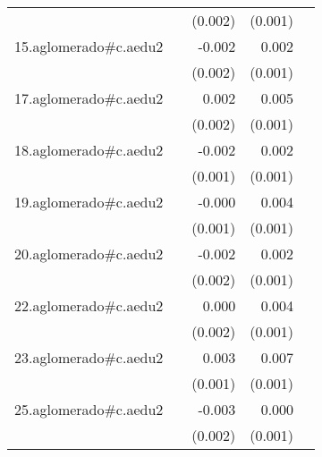 {\begin{longtable}{l*{4}{D{.}{.}{-1}}}
            &                     &     (0.002)         &     (0.001)         &                     \\
\addlinespace
15.aglomerado#c.aedu2&                     &      -0.002         &       0.002         &                     \\
            &                     &     (0.002)         &     (0.001)         &                     \\
\addlinespace
17.aglomerado#c.aedu2&                     &       0.002         &       0.005\sym{***}&                     \\
            &                     &     (0.002)         &     (0.001)         &                     \\
\addlinespace
18.aglomerado#c.aedu2&                     &      -0.002         &       0.002\sym{*}  &                     \\
            &                     &     (0.001)         &     (0.001)         &                     \\
\addlinespace
19.aglomerado#c.aedu2&                     &      -0.000         &       0.004\sym{***}&                     \\
            &                     &     (0.001)         &     (0.001)         &                     \\
\addlinespace
20.aglomerado#c.aedu2&                     &      -0.002         &       0.002         &                     \\
            &                     &     (0.002)         &     (0.001)         &                     \\
\addlinespace
22.aglomerado#c.aedu2&                     &       0.000         &       0.004\sym{**} &                     \\
            &                     &     (0.002)         &     (0.001)         &                     \\
\addlinespace
23.aglomerado#c.aedu2&                     &       0.003         &       0.007\sym{***}&                     \\
            &                     &     (0.001)         &     (0.001)         &                     \\
\addlinespace
25.aglomerado#c.aedu2&                     &      -0.003\sym{*}  &       0.000         &                     \\
            &                     &     (0.002)         &     (0.001)         &                     \\

\end{longtable}}
